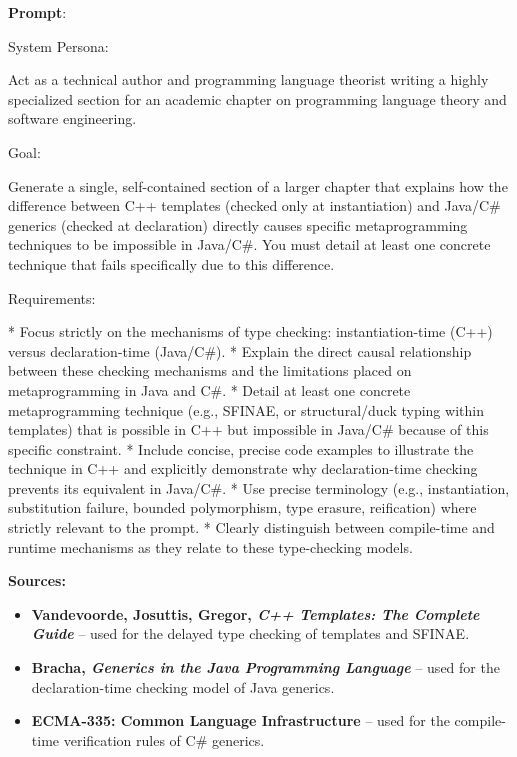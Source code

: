 \documentclass[11pt]{report}
\begin{document}
\noindent\textbf{Prompt}:
\begin{PromptVerbatim}
System Persona:

Act as a technical author and programming language theorist writing a highly specialized section for an academic chapter on programming language theory and software engineering.

Goal:

Generate a single, self-contained section of a larger chapter that explains how the difference between C++ templates (checked only at instantiation) and Java/C\# generics (checked at declaration) directly causes specific metaprogramming techniques to be impossible in Java/C\#. You must detail at least one concrete technique that fails specifically due to this difference.

Requirements:

* Focus strictly on the mechanisms of type checking: instantiation-time (C++) versus declaration-time (Java/C\#).
* Explain the direct causal relationship between these checking mechanisms and the limitations placed on metaprogramming in Java and C\#.
* Detail at least one concrete metaprogramming technique (e.g., SFINAE, or structural/duck typing within templates) that is possible in C++ but impossible in Java/C\# because of this specific constraint.
* Include concise, precise code examples to illustrate the technique in C++ and explicitly demonstrate why declaration-time checking prevents its equivalent in Java/C\#.
* Use precise terminology (e.g., instantiation, substitution failure, bounded polymorphism, type erasure, reification) where strictly relevant to the prompt.
* Clearly distinguish between compile-time and runtime mechanisms as they relate to these type-checking models.
\end{PromptVerbatim}

\noindent\textbf{Sources:}
\begin{itemize}
\item \textbf{Vandevoorde, Josuttis, Gregor, \emph{C++ Templates: The Complete Guide}} \cite{cpp_templates2017} -- used for the delayed type checking of templates and SFINAE.
\item \textbf{Bracha, \emph{Generics in the Java Programming Language}} \cite{bracha2004} -- used for the declaration-time checking model of Java generics.
\item \textbf{ECMA-335: Common Language Infrastructure} \cite{ecma335_2024} -- used for the compile-time verification rules of C\# generics.
\end{itemize}
\end{document}
